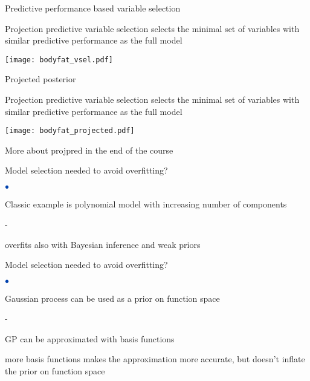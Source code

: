 \documentclass[english,t]{beamer}
\newenvironment{list1}{
   \begin{list}{$\color{list1}\bullet$}{\itemsep=6pt}}{
  \end{list}}
\newenvironment{list2}{
  \begin{list}{-}{\baselineskip=12pt\itemsep=2pt}}{
  \end{list}}
\begin{document}
\begin{frame}{Predictive performance based variable selection}

  \vspace{-0.75\baselineskip}
  Projection predictive variable selection selects the minimal set of
  variables with similar predictive performance as the full model
  
  \vspace{-0.5\baselineskip}
  \texttt{[image: bodyfat\_vsel.pdf]}

\end{frame}

\begin{frame}{Projected posterior}

  \vspace{-0.75\baselineskip}
  Projection predictive variable selection selects the minimal set of
  variables with similar predictive performance as the full model
  
  \texttt{[image: bodyfat\_projected.pdf]}

  {\footnotesize More about projpred in the end of the course}

\end{frame}

\begin{frame}{Model selection needed to avoid overfitting?}

\begin{list1}
\item Classic example is polynomial model with increasing number of components
  \begin{list2}
  \item overfits also with Bayesian inference and weak priors
  \end{list2}
\end{list1}
\vspace{-0.5\baselineskip}

\end{frame}

\begin{frame}{Model selection needed to avoid overfitting?}

\begin{list1}
\item Gaussian process can be used as a prior on function space
  \begin{list2}
  \item GP can be approximated with basis functions
  \item<2-> more basis functions makes the approximation more
    accurate, but doesn't inflate the prior on function space
  \end{list2}
\end{list1}
\vspace{-0.5\baselineskip}

\end{frame}
\end{document}
